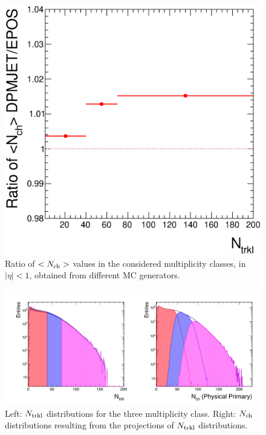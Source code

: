 \begin{figure}[!h]
\centering
 \includegraphics[width=.49\textwidth]{FigCap6/comparisonNtrkl_17f2b_17d2a_17f2a_onlySyst.eps}
 \caption{Ratio of $<N_{\rm ch}>$ values in the considered multiplicity classes, in $|\eta |< 1$, obtained from different MC generators. }
 \label{fig:NchVsMCgenerator}
 \end{figure}

\begin{figure}[!h]
\centering
 \includegraphics[width=1.\textwidth]{FigCap6/NtrklNchDistrWithNtrklsReweight_17f2a.png}
 \caption{Left: $N_{\rm trkl}$ distributions for the three multiplicity class. Right: $N_{\rm ch}$ distributions resulting from the projections of $N_{\rm trkl}$ distributions.}
 \label{fig:NtrklProj}
\end{figure}

